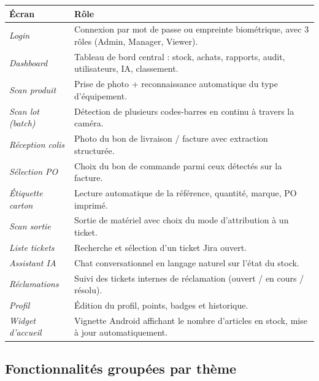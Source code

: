 \documentclass[11pt,a4paper]{article}
\begin{document}
\begin{tabularx}{\linewidth}{@{}lX@{}}
\toprule
\textbf{Écran} & \textbf{Rôle}\\
\midrule
\textit{Login}                & Connexion par mot de passe ou empreinte biométrique, avec 3 rôles (Admin, Manager, Viewer). \\
\textit{Dashboard}            & Tableau de bord central : stock, achats, rapports, audit, utilisateurs, IA, classement. \\
\textit{Scan produit}         & Prise de photo + reconnaissance automatique du type d'équipement. \\
\textit{Scan lot (batch)}     & Détection de plusieurs codes-barres en continu à travers la caméra. \\
\textit{Réception colis}      & Photo du bon de livraison / facture avec extraction structurée. \\
\textit{Sélection PO}         & Choix du bon de commande parmi ceux détectés sur la facture. \\
\textit{Étiquette carton}     & Lecture automatique de la référence, quantité, marque, PO imprimé. \\
\textit{Scan sortie}          & Sortie de matériel avec choix du mode d'attribution à un ticket. \\
\textit{Liste tickets}        & Recherche et sélection d'un ticket Jira ouvert. \\
\textit{Assistant IA}         & Chat conversationnel en langage naturel sur l'état du stock. \\
\textit{Réclamations}         & Suivi des tickets internes de réclamation (ouvert / en cours / résolu). \\
\textit{Profil}               & Édition du profil, points, badges et historique. \\
\textit{Widget d'accueil}     & Vignette Android affichant le nombre d'articles en stock, mise à jour automatiquement. \\
\bottomrule
\end{tabularx}

\subsection{Fonctionnalités groupées par thème}
\end{document}
